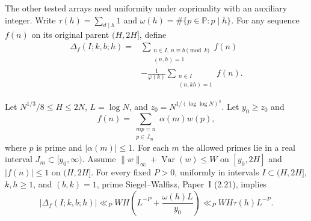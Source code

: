 The other tested arrays need uniformity under coprimality
with an auxiliary integer. Write \(\tau(h)=\sum_{d\mid h}1\) and
\(\omega(h)=\#\{p\in\mathbb P:p\mid h\}\).
For any sequence \(f(n)\) on its original parent \((H,2H]\), define
\begin{equation}\label{eq:ra-sw-difference}
\begin{aligned}
 \Delta_f(I;k,b;h)={}&
 \sum_{\substack{n\in I,\ n\equiv b\pmod k\\(n,h)=1}}f(n)\\
 &-\frac1{\varphi(k)}
     \sum_{\substack{n\in I\\(n,kh)=1}}f(n) .
\end{aligned}
\end{equation}
\begin{lemma}\label{lem:ra-prime-transfer}
Let \(N^{1/3}/8\le H\le 2N\), \(L=\log N\), and
\(z_0=N^{1/(\log\log N)^3}\). Let \(y_0\ge z_0\) and
\[
 f(n)=\sum_{\substack{mp=n\\p\in J_m}}\alpha(m)w(p),
\]
where \(p\) is prime and \(|\alpha(m)|\le1\).
For each \(m\) the
allowed primes lie in a real interval \(J_m\subset[y_0,\infty)\).
Assume \(\|w\|_\infty+\operatorname{Var}(w)\le W\) on \([y_0,2H]\)
and \(|f(n)|\le1\) on \((H,2H]\). For every fixed \(P>0\), uniformly
in intervals \(I\subset(H,2H]\), \(k,h\ge1\), and \((b,k)=1\),
prime Siegel--Walfisz, Paper~I (2.21), implies
\begin{equation}\label{eq:ra-prime-transfer}
 |\Delta_f(I;k,b;h)|
 \ll_P WH\left(L^{-P}+\frac{\omega(h)L}{y_0}\right)
 \ll_P WH\tau(h)L^{-P}.
\end{equation}
\end{lemma}
